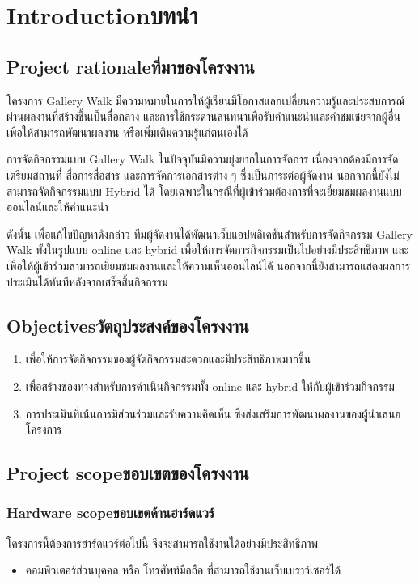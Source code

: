 \chapter{\ifenglish Introduction\else บทนำ\fi}

\section{\ifenglish Project rationale\else ที่มาของโครงงาน\fi}

โครงการ Gallery Walk มีความหมายในการให้ผู้เรียนมีโอกาสแลกเปลี่ยนความรู้และประสบการณ์ผ่านผลงานที่สร้างขึ้นเป็นสื่อกลาง และการใช้กระดานสนทนาเพื่อรับคำแนะนำและคำชมเชยจากผู้อื่น เพื่อให้สามารถพัฒนาผลงาน หรือเพิ่มเติมความรู้แก่ตนเองได้

การจัดกิจกรรมแบบ Gallery Walk ในปัจจุบันมีความยุ่งยากในการจัดการ เนื่องจากต้องมีการจัดเตรียมสถานที่ สื่อการสื่อสาร และการจัดการเอกสารต่าง ๆ ซึ่งเป็นภาระต่อผู้จัดงาน นอกจากนี้ยังไม่สามารถจัดกิจกรรมแบบ Hybrid ได้ โดยเฉพาะในกรณีที่ผู้เข้าร่วมต้องการที่จะเยี่ยมชมผลงานแบบออนไลน์และให้คำแนะนำ

ดังนั้น เพื่อแก้ไขปัญหาดังกล่าว ทีมผู้จัดงานได้พัฒนาเว็บแอปพลิเคชันสำหรับการจัดกิจกรรม Gallery Walk ทั้งในรูปแบบ online และ hybrid เพื่อให้การจัดการกิจกรรมเป็นไปอย่างมีประสิทธิภาพ และเพื่อให้ผู้เข้าร่วมสามารถเยี่ยมชมผลงานและให้ความเห็นออนไลน์ได้ นอกจากนี้ยังสามารถแสดงผลการประเมินได้ทันทีหลังจากเสร็จสิ้นกิจกรรม

\section{\ifenglish Objectives\else วัตถุประสงค์ของโครงงาน\fi}
\begin{enumerate}
    \item เพื่อให้การจัดกิจกรรมของผู้จัดกิจกรรมสะดวกและมีประสิทธิภาพมากขึ้น
    \item เพื่อสร้างช่องทางสําหรับการดําเนินกิจกรรมทั้ง online และ hybrid ให้กับผู้เข้าร่วมกิจกรรม
    \item การประเมินที่เน้นการมีส่วนร่วมและรับความคิดเห็น ซึ่งส่งเสริมการพัฒนาผลงานของผู้นำเสนอโครงการ
\end{enumerate}

\section{\ifenglish Project scope\else ขอบเขตของโครงงาน\fi}

\subsection{\ifenglish Hardware scope\else ขอบเขตด้านฮาร์ดแวร์\fi}
โครงการนี้ต้องการฮาร์ดแวร์ต่อไปนี้ จึงจะสามารถใช้งานได้อย่างมีประสิทธิภาพ
\begin{itemize}
    \item คอมพิวเตอร์ส่วนบุคคล หรือ โทรศัพท์มือถือ ที่สามารถใช้งานเว็บเบราว์เซอร์ได้
\end{itemize}

